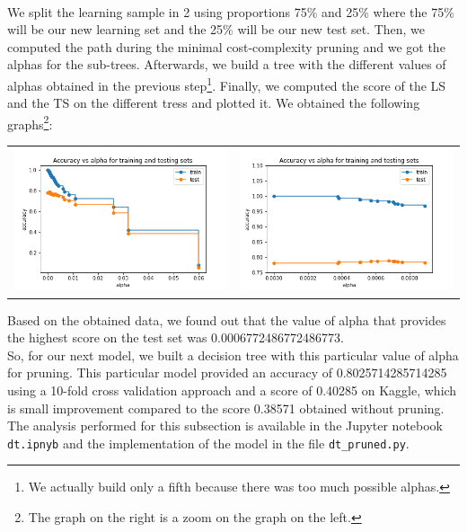 \documentclass[a4paper, 11pt, oneside]{article}
\begin{document}
\paragraph{}We split the learning sample in 2 using proportions 75\% and 25\% where the 75\% will be our new learning set and the 25\% will be our new test set. Then, we computed the path during the minimal cost-complexity pruning and we got the alphas for the sub-trees. Afterwards, we build a tree with the different values of alphas obtained in the previous step\footnote{We actually build only a fifth because there was too much possible alphas.}. Finally, we computed the score of the LS and the TS on the different tress and plotted it. We obtained the following graphs\footnote{The graph on the right is a zoom on the graph on the left.}:
\begin{table}[H]
\centering
\begin{tabular}{ll}
\includegraphics[scale=0.35]{dt/dt_pruning_study.png} & \includegraphics[scale=0.35]{dt/dt_pruning_study_zoomed.png}
\end{tabular}
\end{table}
Based on the obtained data, we found out that the value of alpha that provides the highest score on the test set was 0.0006772486772486773.\\
So, for our next model, we built a decision tree with this particular value of alpha for pruning. This particular model provided an accuracy of 0.8025714285714285 using a 10-fold cross validation approach and a score of 0.40285 on Kaggle, which is small improvement compared to the score 0.38571 obtained without pruning.\\
The analysis performed for this subsection is available in the Jupyter notebook \texttt{dt.ipnyb} and the implementation of the model in the file \texttt{dt\_pruned.py}.
\end{document}

